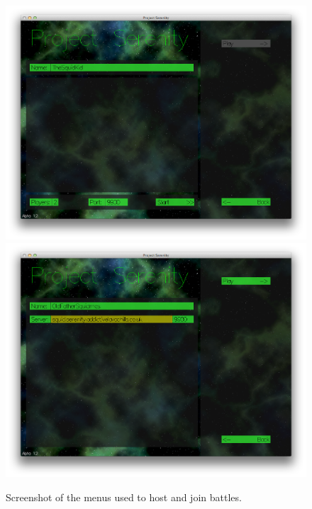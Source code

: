 \begin{figure}[p]
	\includegraphics[width=15.5cm]{res/serenityscreens/02-host}
	\includegraphics[width=15.5cm]{res/serenityscreens/03-join}
	\caption[Menus for hosting and joining battles]{Screenshot of the menus used to host and join battles.}
	\label{fig:hostjoin}
\end{figure}

